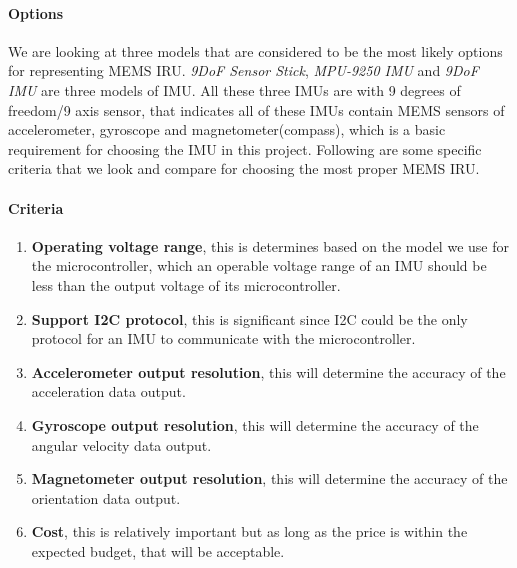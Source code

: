 \paragraph{Options}
We are looking at three models that are considered to be the most likely options for representing MEMS IRU. \textit{9DoF Sensor Stick}\cite{sensorStick}, \textit{MPU-9250 IMU}\cite{mpu9250} and \textit{9DoF IMU}\cite{9dof} are three models of IMU. All these three IMUs are with 9 degrees of freedom/9 axis sensor, that indicates all of these IMUs contain MEMS sensors of accelerometer, gyroscope and magnetometer(compass), which is a basic requirement for choosing the IMU in this project. Following are some specific criteria that we look and compare for choosing the most proper MEMS IRU.\\

\paragraph{Criteria}
\begin{enumerate}
	\item \textbf{Operating voltage range},  this is determines based on the model we use for the microcontroller, which an operable voltage range of an IMU should be less than the output voltage of its microcontroller.
	\item \textbf{Support I2C protocol}, this is significant since I2C could be the only protocol for an IMU to communicate with the microcontroller.
	\item \textbf{Accelerometer output resolution}, this will determine the accuracy of the acceleration data output.
	\item \textbf{Gyroscope output resolution}, this will determine the accuracy of the angular velocity data output.
	\item \textbf{Magnetometer output resolution}, this will determine the accuracy of the orientation data output.
	\item \textbf{Cost}, this is relatively important but as long as the price is within the expected budget, that will be acceptable.\\
\end{enumerate}

